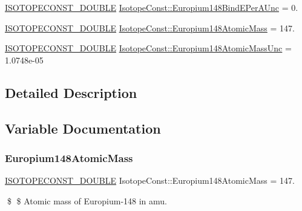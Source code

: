 \begin{DoxyCompactItemize}
\mbox{\hyperlink{group___isotope_const-_macros_ga8f45a7272ce02c0b4c65c44636ed719a}{I\+S\+O\+T\+O\+P\+E\+C\+O\+N\+S\+T\+\_\+\+D\+O\+U\+B\+LE}} \mbox{\hyperlink{group___isotope_const-_europium-_eu148_ga94828f40ebbd4819b3c787accac7980f}{Isotope\+Const\+::\+Europium148\+Bind\+E\+Per\+A\+Unc}} = 0.
\item 
\mbox{\hyperlink{group___isotope_const-_macros_ga8f45a7272ce02c0b4c65c44636ed719a}{I\+S\+O\+T\+O\+P\+E\+C\+O\+N\+S\+T\+\_\+\+D\+O\+U\+B\+LE}} \mbox{\hyperlink{group___isotope_const-_europium-_eu148_ga6a5991adbde776cb9cd036de5c5fc51b}{Isotope\+Const\+::\+Europium148\+Atomic\+Mass}} = 147.
\item 
\mbox{\hyperlink{group___isotope_const-_macros_ga8f45a7272ce02c0b4c65c44636ed719a}{I\+S\+O\+T\+O\+P\+E\+C\+O\+N\+S\+T\+\_\+\+D\+O\+U\+B\+LE}} \mbox{\hyperlink{group___isotope_const-_europium-_eu148_ga7f1857253dcbe52f681c566f04e3a5db}{Isotope\+Const\+::\+Europium148\+Atomic\+Mass\+Unc}} = 1.\+0748e-\/05
\end{DoxyCompactItemize}


\subsection{Detailed Description}


\subsection{Variable Documentation}
\mbox{\label{group___isotope_const-_europium-_eu148_ga6a5991adbde776cb9cd036de5c5fc51b}} 
\subsubsection{\texorpdfstring{Europium148\+Atomic\+Mass}{Europium148AtomicMass}}
{\footnotesize\ttfamily \mbox{\hyperlink{group___isotope_const-_macros_ga8f45a7272ce02c0b4c65c44636ed719a}{I\+S\+O\+T\+O\+P\+E\+C\+O\+N\+S\+T\+\_\+\+D\+O\+U\+B\+LE}} Isotope\+Const\+::\+Europium148\+Atomic\+Mass = 147.}

\$ \$ Atomic mass of Europium-\/148 in amu. \mbox{\label{group___isotope_const-_europium-_eu148_ga7f1857253dcbe52f681c566f04e3a5db}} 
